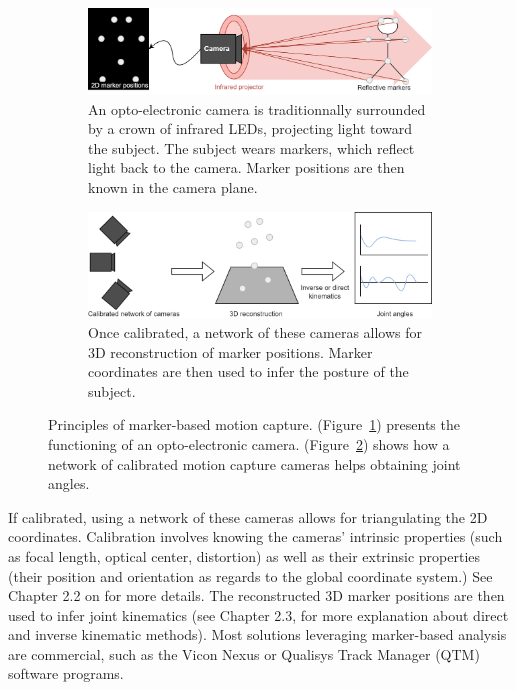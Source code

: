 \begin{figure}[hbtp]
	\centering
	\begin{subfigure}[b]{1\textwidth}
		\centering
		\def\svgwidth{\columnwidth}
		\fontsize{10pt}{10pt}\selectfont
		\includegraphics[width=\linewidth]{"../Chap1/Figures/Fig_Markers_1.png"}
		\caption{An opto-electronic camera is traditionnally surrounded by a crown of infrared LEDs, projecting light toward the subject. The subject wears markers, which reflect light back to the camera. Marker positions are then known in the camera plane.}
		\label{fig_mk1}
	\end{subfigure}
	\qquad
	\begin{subfigure}[b]{1\textwidth}
		\centering
		\def\svgwidth{\columnwidth}
		\fontsize{10pt}{10pt}\selectfont
		\includegraphics[width=\linewidth]{"../Chap1/Figures/Fig_Markers_2.png"}
		\caption{Once calibrated, a network of these cameras allows for 3D reconstruction of marker positions. Marker coordinates are then used to infer the posture of the subject.}
		\label{fig_mk2}
	\end{subfigure}
	\caption{Principles of marker-based motion capture. (Figure~\ref{fig_mk1}) presents the functioning of an opto-electronic camera. (Figure~\ref{fig_mk2}) shows how a network of calibrated motion capture cameras helps obtaining joint angles.}
	\label{fig_mk}
\end{figure}

If calibrated, using a network of these cameras allows for triangulating the 2D coordinates. Calibration involves knowing the cameras' intrinsic properties (such as focal length, optical center, distortion) as well as their extrinsic properties (their position and orientation as regards to the global coordinate system.) See Chapter 2.2 on  for more details. The reconstructed 3D marker positions are then used to infer joint kinematics (see Chapter 2.3,  for more explanation about direct and inverse kinematic methods). Most solutions leveraging marker-based analysis are commercial, such as the Vicon Nexus \cite{Qualisys} or Qualisys Track Manager (QTM) \cite{Vicon} software programs.

